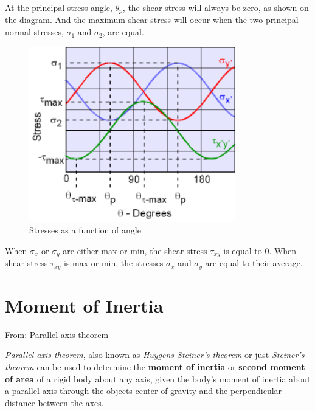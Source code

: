 \begin{itemize}
        At the principal stress angle, $\theta_{p}$, the shear stress will always be zero,
        as shown on the diagram. And the maximum shear stress will occur when the
        two principal normal stresses, $\sigma_1$ and $\sigma_2$, are equal.

        \begin{figure}[ht]
            \centering
            \includegraphics[width=0.8\textwidth]{img/stresses_as_function_of_angle}
            \caption{Stresses as a function of angle}
            \label{fig:stresses_as_function_of_angle-png}
        \end{figure}

        \begin{bbox}[0.85]
            When $\sigma_{x}$ or $\sigma_{y}$ are either max or min, the shear stress
            $\tau_{xy}$ is equal to 0. When shear stress $\tau_{xy}$ is max or min,
            the stresses $\sigma_{x}$ and $\sigma_{y}$ are equal to their average.
        \end{bbox}


\end{itemize}


\section{Moment of Inertia}

From: \href{https://en.wikipedia.org/wiki/Parallel_axis_theorem}{Parallel axis theorem}

\textit{Parallel axis theorem}, also known as \textit{Huygens-Steiner's theorem}
or just \textit{Steiner's theorem} can be used to determine the \textbf{moment of inertia}
or \textbf{second moment of area} of a rigid body about any axis, given the body's
moment of inertia about a parallel axis through the objects center of gravity
and the perpendicular distance between the axes.

